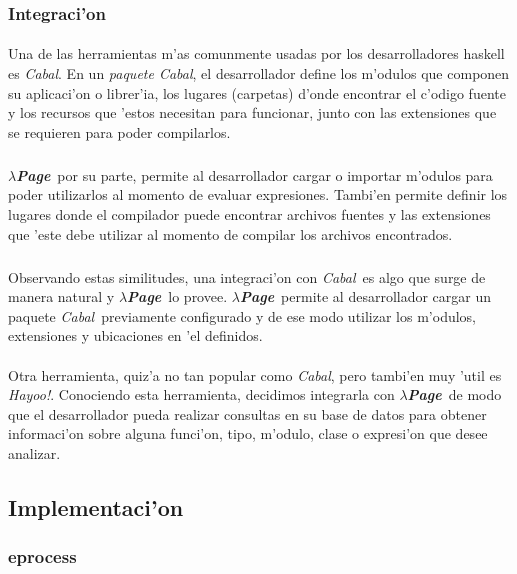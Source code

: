 \documentclass[a4paper]{article}
\newcommand{\hpage}{\textbf{\textsl{$\lambda$Page}}}
\newcommand{\cabal}{\textsl{Cabal}}
\begin{document}
\subsubsection{Integraci'on}
\paragraph{}Una de las herramientas m'as comunmente usadas por los desarrolladores haskell es \cabal.  En un \textsl{paquete Cabal}, el desarrollador define los m'odulos que componen su aplicaci'on o librer'ia, los lugares (carpetas) d'onde encontrar el c'odigo fuente y los recursos que 'estos necesitan para funcionar, junto con las extensiones que se requieren para poder compilarlos.
\subparagraph{}\hpage\ por su parte, permite al desarrollador cargar o importar m'odulos para poder utilizarlos al momento de evaluar expresiones.  Tambi'en permite definir los lugares donde el compilador puede encontrar archivos fuentes y las extensiones que 'este debe utilizar al momento de compilar los archivos encontrados.
\subparagraph{}Observando estas similitudes, una integraci'on con \cabal\ es algo que surge de manera natural y \hpage\ lo provee.  \hpage\ permite al desarrollador cargar un paquete \cabal\ previamente configurado y de ese modo utilizar los m'odulos, extensiones y ubicaciones en 'el definidos.
\paragraph{}Otra herramienta, quiz'a no tan popular como \cabal, pero tambi'en muy 'util es \textsl{Hayoo!}.  Conociendo esta herramienta, decidimos integrarla con \hpage\ de modo que el desarrollador pueda realizar consultas en su base de datos para obtener informaci'on sobre alguna funci'on, tipo, m'odulo, clase o expresi'on que desee analizar.

\newpage
\subsection{Implementaci'on}\label{secImplement}
\begin{epigraphs}
\end{epigraphs}

\subsubsection{eprocess}\label{secEprocess}
\end{document}
